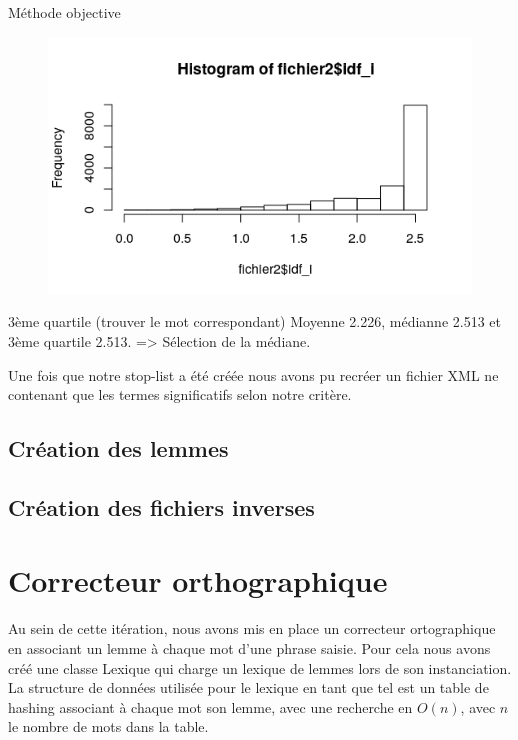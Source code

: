 \documentclass{article}
\begin{document}
Méthode objective
\begin{figure}
\begin{center}
\includegraphics{rapport/hist_idf.png} 
\end{center}
\end{figure}

3ème quartile (trouver le mot correspondant)
Moyenne 2.226, médianne 2.513 et 3ème quartile 2.513. => Sélection de la médiane.

Une fois que notre stop-list a été créée nous avons pu recréer un fichier XML ne contenant que les termes significatifs selon notre critère.

\subsection{Création des lemmes}

\subsection{Création des fichiers inverses}

\section{Correcteur orthographique}
Au sein de cette itération, nous avons mis en place un correcteur ortographique en associant un lemme à chaque mot d'une phrase saisie. Pour cela nous avons créé une classe Lexique qui charge un lexique de lemmes lors de son instanciation. La structure de données utilisée pour le lexique en tant que tel est un table de hashing associant à chaque mot son lemme, avec une recherche en $O(n)$, avec $n$ le nombre de mots dans la table.
\end{document}
